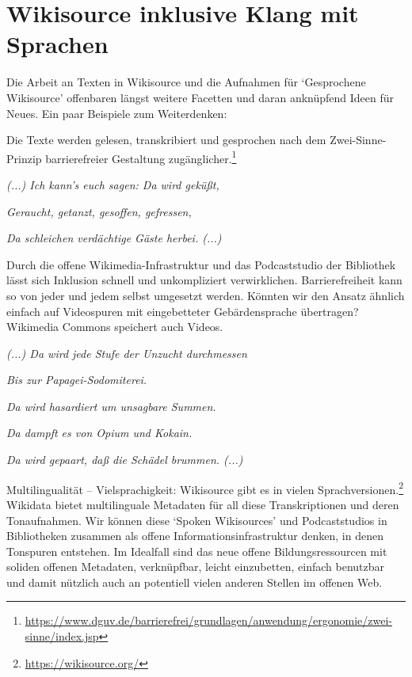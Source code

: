 \documentclass[a4paper,
fontsize=11pt,
oneside,
numbers=noperiodatend,
parskip=half-,
bibliography=totoc,
final
]{scrartcl}
\begin{document}
\hypertarget{wikisource-inklusive-klang-mit-sprachen}{%
\section{Wikisource inklusive Klang mit
Sprachen}\label{wikisource-inklusive-klang-mit-sprachen}}

Die Arbeit an Texten in Wikisource und die Aufnahmen für
\enquote*{Gesprochene Wikisource} offenbaren längst weitere Facetten und
daran anknüpfend Ideen für Neues. Ein paar Beispiele zum Weiterdenken:

Die Texte werden gelesen, transkribiert und gesprochen nach dem
Zwei-Sinne-Prinzip barrierefreier Gestaltung zugänglicher.\footnote{\url{https://www.dguv.de/barrierefrei/grundlagen/anwendung/ergonomie/zwei-sinne/index.jsp}}

\begin{center}
\emph{(...) Ich kann's euch sagen: Da wird geküßt,}

\emph{Geraucht, getanzt, gesoffen, gefressen,}

\emph{Da schleichen verdächtige Gäste herbei. (...)}
\end{center}

Durch die offene Wikimedia-Infrastruktur und das Podcaststudio der
Bibliothek lässt sich Inklusion schnell und unkompliziert verwirklichen.
Barrierefreiheit kann so von jeder und jedem selbst umgesetzt werden.
Könnten wir den Ansatz ähnlich einfach auf Videospuren mit eingebetteter
Gebärdensprache übertragen? Wikimedia Commons speichert auch Videos.

\begin{center}
\emph{(...) Da wird jede Stufe der Unzucht durchmessen}

\emph{Bis zur Papagei-Sodomiterei.}

\emph{Da wird hasardiert um unsagbare Summen.}

\emph{Da dampft es von Opium und Kokain.}

\emph{Da wird gepaart, daß die Schädel brummen. (...)}
\end{center}

Multilingualität -- Vielsprachigkeit: Wikisource gibt es in vielen
Sprachversionen.\footnote{\url{https://wikisource.org/}} Wikidata bietet
multilinguale Metadaten für all diese Transkriptionen und deren
Tonaufnahmen. Wir können diese \enquote*{Spoken Wikisources} und
Podcaststudios in Bibliotheken zusammen als offene
Informationsinfrastruktur denken, in denen Tonspuren entstehen. Im
Idealfall sind das neue offene Bildungsressourcen mit soliden offenen
Metadaten, verknüpfbar, leicht einzubetten, einfach benutzbar und damit
nützlich auch an potentiell vielen anderen Stellen im offenen Web.
\end{document}
